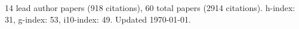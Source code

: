 14 lead author papers (918 citations),
60 total papers (2914 citations).\newline
h-index: 31, g-index: 53, i10-index: 49. Updated \today.